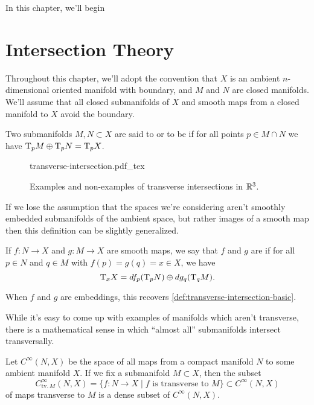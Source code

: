In this chapter, we'll begin


\section{Intersection Theory}

Throughout this chapter, we'll adopt the convention that $X$ is an ambient $n$-dimensional oriented manifold with boundary, and $M$ and $N$ are closed manifolds. We'll assume that all closed submanifolds of $X$ and smooth maps from a closed manifold to $X$ avoid the boundary.

\begin{definition}\label{def:transverse-intersection-basic}
	Two submanifolds $M,N\subset X$ are said to  or to be  if for all points $p\in M\cap N$ we have $\mathrm{T}_p M\oplus \mathrm{T}_p N = \mathrm{T}_p X$.
\end{definition}

\begin{figure}[ht]
	\centering
	{transverse-intersection.pdf_tex}
	\medskip
	\caption{Examples and non-examples of transverse intersections in $\mathbb{R}^3$.}\label{fig:transverse-intersection}
\end{figure}

If we lose the assumption that the spaces we're considering aren't smoothly embedded submanifolds of the ambient space, but rather images of a smooth map then this definition can be slightly generalized.

\begin{definition}\label{def:transverse-intersection}
	If $f : N \to X$ and $g : M \to X$ are smooth maps, we say that $f$ and $g$ are  if for all $p\in N$ and $q\in M$ with $f(p)=g(q)=x\in X$, we have
	\[
		\mathrm{T}_x X = df_p(\mathrm{T}_p N) \oplus dg_q(\mathrm{T}_q M).
	\]
\end{definition}

\begin{remark}
When $f$ and $g$ are embeddings, this recovers \cref{def:transverse-intersection-basic}.
\end{remark}

While it's easy to come up with examples of manifolds which aren't transverse, there is a mathematical sense in which ``almost all'' submanifolds intersect transversally.

\begin{theorem}
	Let $C^\infty(N,X)$ be the space of all maps from a compact manifold $N$ to some ambient manifold $X$. If we fix a submanifold $M\subset X$, then the subset
	\[
		C^\infty_{\mathrm{tv.}\,M}(N,X)=\{ f : N \to X \mid f\textrm{ is transverse to } M\}\subset C^\infty(N,X)
	\]
	of maps transverse to $M$ is a dense subset of $C^\infty(N,X)$.
\end{theorem}

